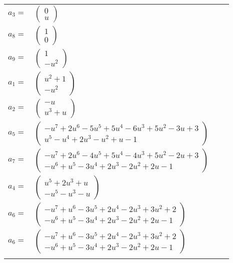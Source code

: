 \documentclass[1p]{elsarticle_modified}
\theoremstyle{definition}
\begin{document}
\begin{tabular}{m{7pt} m{180pt} m{7pt} m{180pt} }
\flushright $a_{3}=$&$\begin{pmatrix}0\\u\end{pmatrix}$ \\
\flushright $a_{8}=$&$\begin{pmatrix}1\\0\end{pmatrix}$ \\
\flushright $a_{9}=$&$\begin{pmatrix}1\\- u^2\end{pmatrix}$ \\
\flushright $a_{1}=$&$\begin{pmatrix}u^2+1\\- u^2\end{pmatrix}$ \\
\flushright $a_{2}=$&$\begin{pmatrix}- u\\u^3+u\end{pmatrix}$ \\
\flushright $a_{5}=$&$\begin{pmatrix}- u^7+2 u^6-5 u^5+5 u^4-6 u^3+5 u^2-3 u+3\\u^5- u^4+2 u^3- u^2+u-1\end{pmatrix}$ \\
\flushright $a_{7}=$&$\begin{pmatrix}- u^7+2 u^6-4 u^5+5 u^4-4 u^3+5 u^2-2 u+3\\- u^6+u^5-3 u^4+2 u^3-2 u^2+2 u-1\end{pmatrix}$ \\
\flushright $a_{4}=$&$\begin{pmatrix}u^5+2 u^3+u\\- u^5- u^3- u\end{pmatrix}$ \\
\flushright $a_{6}=$&$\begin{pmatrix}- u^7+u^6-3 u^5+2 u^4-2 u^3+3 u^2+2\\- u^6+u^5-3 u^4+2 u^3-2 u^2+2 u-1\end{pmatrix}$\\ \flushright $a_{6}=$&$\begin{pmatrix}- u^7+u^6-3 u^5+2 u^4-2 u^3+3 u^2+2\\- u^6+u^5-3 u^4+2 u^3-2 u^2+2 u-1\end{pmatrix}$\\&\end{tabular}
\end{document}
